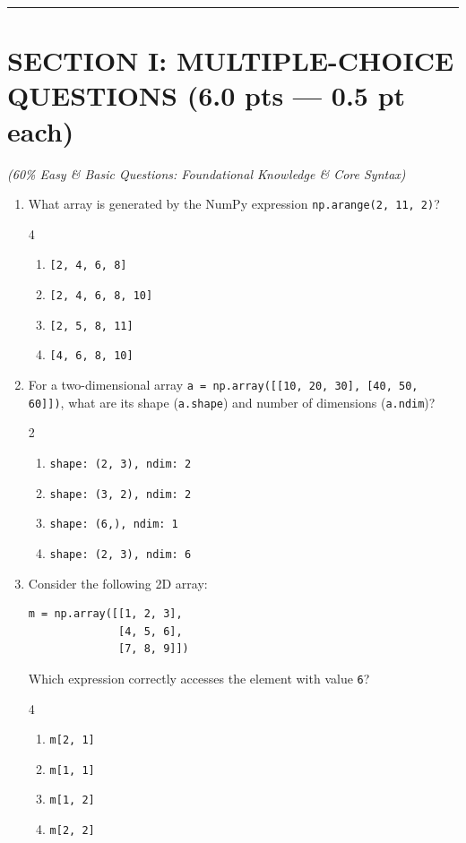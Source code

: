 \documentclass[11pt,a4paper]{article}
\begin{document}
\vspace{-3mm}
\hrule
\vspace{1.5mm}

\section*{SECTION I: MULTIPLE-CHOICE QUESTIONS (6.0 pts --- 0.5 pt each)}
\textit{\small (60\% Easy \& Basic Questions: Foundational Knowledge \& Core Syntax)}

\begin{enumerate}[leftmargin=*,itemsep=2.5pt]

\item What array is generated by the NumPy expression \texttt{np.arange(2, 11, 2)}?
\begin{multicols}{4}
\begin{enumerate}[label=\Alph*.]
  \item \texttt{[2, 4, 6, 8]}
  \item \texttt{[2, 4, 6, 8, 10]}
  \item \texttt{[2, 5, 8, 11]}
  \item \texttt{[4, 6, 8, 10]}
\end{enumerate}
\end{multicols}

\item For a two-dimensional array \texttt{a = np.array([[10, 20, 30], [40, 50, 60]])}, what are its shape (\texttt{a.shape}) and number of dimensions (\texttt{a.ndim})?
\begin{multicols}{2}
\begin{enumerate}[label=\Alph*.]
  \item \texttt{shape: (2, 3), ndim: 2}
  \item \texttt{shape: (3, 2), ndim: 2}
  \item \texttt{shape: (6,), ndim: 1}
  \item \texttt{shape: (2, 3), ndim: 6}
\end{enumerate}
\end{multicols}

\item Consider the following 2D array:
\begin{lstlisting}
m = np.array([[1, 2, 3],
              [4, 5, 6],
              [7, 8, 9]])
\end{lstlisting}
Which expression correctly accesses the element with value \texttt{6}?
\begin{multicols}{4}
\begin{enumerate}[label=\Alph*.]
  \item \texttt{m[2, 1]}
  \item \texttt{m[1, 1]}
  \item \texttt{m[1, 2]}
  \item \texttt{m[2, 2]}
\end{enumerate}
\end{multicols}

\end{enumerate}
\end{document}
